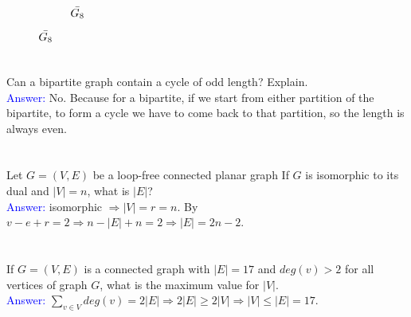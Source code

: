 \documentclass[a4paper]{article}
\begin{document}
\begin{enumerate}[label=\alph*)]
\begin{figure}[!htbp]
\begin{subfigure}[!htbp]{0.32\textwidth}
                \caption{$\Bar{G_8}$}
            \end{subfigure}
        \end{figure}
\end{enumerate}
\section{}
Can a bipartite graph contain a cycle of odd length? Explain.\\
 \textcolor{blue}{Answer:} No. Because for a bipartite, if we start from either partition of the bipartite, to form a cycle we have to come back to that partition, so the length is always even.
\section{}
Let $G=(V,E)$ be a loop-free connected planar graph If $G$ is isomorphic to its dual and $|V|=n$, what is $|E|$?\\
\textcolor{blue}{Answer:} isomorphic $\Rightarrow |V|=r=n$. By $v-e+r=2\Rightarrow n-|E|+n=2\Rightarrow |E|=2n-2$.

\section{}
If $G = (V,E)$ is a connected graph with $|E| = 17$ and $deg(v) > 2$ for all vertices of graph $G$, what is the maximum value for $|V|$.\\
\textcolor{blue}{Answer:} $\sum_{v\in V}{deg(v)}=2|E|\Rightarrow 2|E|\geq 2|V|\Rightarrow |V|\leq |E|=17$.
\end{document}
